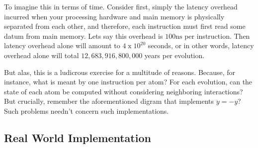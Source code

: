 To imagine this in terms of time. Consider first, simply the latency overhead incurred when your processing hardware and main memory is physically separated from each other, and therefore, each instruction must first read some datum from main memory. Lets say this overhead is $100\mathrm{ns}$ per instruction. Then latency overhead alone will amount to $4\;\mathrm{x}\;10^{20}$ seconds, or in other words, latency overhead alone will total $12,683,916,800,000$ years per evolution.

But alas, this is a ludicrous exercise for a multitude of reasons. Because, for instance, what is meant by one instruction per atom? For each evolution, can the state of each atom be computed without considering neighboring interactions? But crucially, remember the aforementioned digram that implements $\ddot{y} = -y$? Such problems needn't concern such implementations. 


\subsection*{Real World Implementation}






